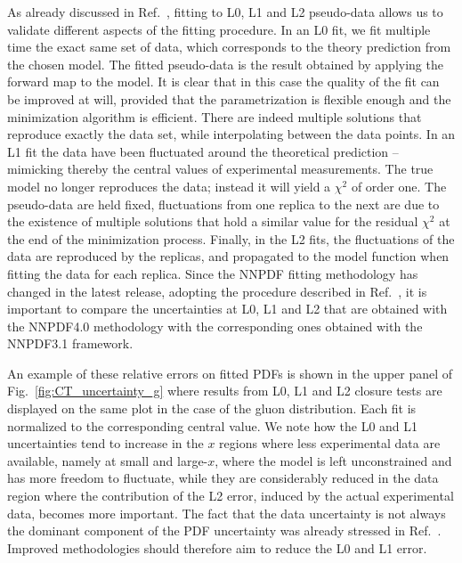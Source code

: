 As already discussed in Ref.~\cite{nnpdf30}, fitting to L0, L1 and L2
pseudo-data allows us to validate different aspects of the fitting procedure. In
an L0 fit, we fit multiple time the exact same set of data, which corresponds to
the theory prediction from the chosen model. The fitted pseudo-data is the
result obtained by applying the forward map to the model. It is clear that in
this case the quality of the fit can be improved at will, provided that the
parametrization is flexible enough and the minimization algorithm is efficient.
There are indeed multiple solutions that reproduce exactly the data set, while
interpolating between the data points. In an L1 fit the data have been
fluctuated around the theoretical prediction -- mimicking thereby the central
values of experimental measurements. The true model no longer reproduces the
data; instead it will yield a $\chi^2$ of order one. The pseudo-data are held
fixed, fluctuations from one replica to the next are due to the existence of
multiple solutions that hold a similar value for the residual $\chi^2$ at the
end of the minimization process. Finally, in the L2 fits, the fluctuations of
the data are reproduced by the replicas, and propagated to the model function
when fitting the data for each replica. Since the NNPDF fitting methodology has
changed in the latest release, adopting the procedure described in
Ref.~\cite{Carrazza:2019mzf}, it is important to compare the uncertainties at
L0, L1 and L2 that are obtained with the NNPDF4.0 methodology with the
corresponding ones obtained with the NNPDF3.1 framework.

An example of these relative errors on fitted PDFs is shown in the upper panel of
Fig.~\ref{fig:CT_uncertainty_g} where results from L0, L1 and L2 closure tests
are displayed on the same plot in the case of the gluon distribution. Each fit
is normalized to the corresponding central value. We note how the L0 and L1
uncertainties tend to increase in the $x$ regions where less experimental data
are available, namely at small and large-$x$, where the model is left
unconstrained and has more freedom to fluctuate, while they are considerably
reduced in the data region where the contribution of the L2 error, induced by
the actual experimental data, becomes more important. The fact that the data
uncertainty is not always the dominant component of the PDF uncertainty was
already stressed in Ref.~\cite{nnpdf30}. Improved methodologies should therefore
aim to reduce the L0 and L1 error. 


